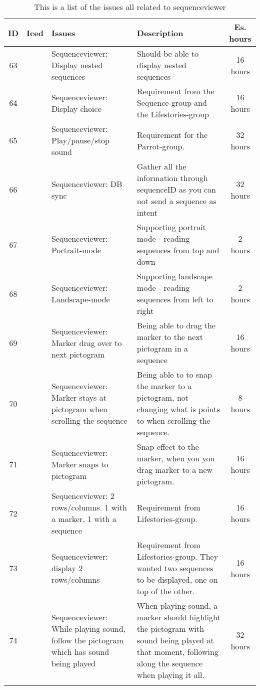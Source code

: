 \begin{longtable} { | c | c | p{5cm} | p{5cm} | c | } 
\hline
	ID 	& Iced	&	Issues	&	Description		&	 Es. hours \\\hline
	63	& 		& 	Sequenceviewer: Display nested sequences	&	Should be able to display nested sequences		& 	16 hours \\\hline
	64	& 		&   Sequenceviewer: Display choice	&	Requirement from the Sequence-group and the Lifestories-group	& 	16 hours  \\\hline
	65	& 		& 	Sequenceviewer: Play/pause/stop sound	&	Requirement for the Parrot-group.	& 	32 hours  \\\hline
	66	& 		& 	Sequenceviewer: DB sync	&	Gather all the information through sequenceID as you can not send a sequence as intent			 &  32 hours \\\hline
	67	& 		& 	Sequenceviewer: Portrait-mode	&	Supporting portrait mode - reading sequences from top and down	&   2 hours \\\hline
	68	&		& 	Sequenceviewer: Landscape-mode	&	Supporting landscape mode - reading sequences from left to right		& 		   2 hours \\\hline
	69	& 		& 	Sequenceviewer: Marker drag over to next pictogram	&	Being able to drag the marker to the next pictogram in a sequence	& 	16 hours	   \\\hline
	70	& 		& 	Sequenceviewer: Marker stays at pictogram when scrolling the sequence	&	Being able to to snap the marker to a pictogram, not changing what is points to when scrolling the sequence.		& 	8 hours	   \\\hline
	71	& 		& 	Sequenceviewer: Marker snaps to pictogram	&	Snap-effect to the marker, when you you drag marker to a new pictogram.	& 		16 hours   \\\hline
	72	& 		& 	Sequenceviewer: 2 rows/columns. 1 with a marker, 1 with a sequence	&	Requirement from Lifestories-group.	& 	16 hours	   \\\hline
	73	& 		& 	Sequenceviewer: display 2 rows/columns	&	Requirement from Lifestories-group. They wanted two sequences to be displayed, one on top of the other.	& 	16 hours	   \\\hline
	74	& 		& 	Sequenceviewer: While playing sound, follow the pictogram which has sound being played	&	When playing sound, a marker should highlight the pictogram with sound being played at that moment, following along the sequence when playing it all.	& 		32 hours   \\\hline
\caption{This is a list of the issues all related to sequenceviewer}
\label{tab:spr4_sw_prodblog}
\end{longtable}
